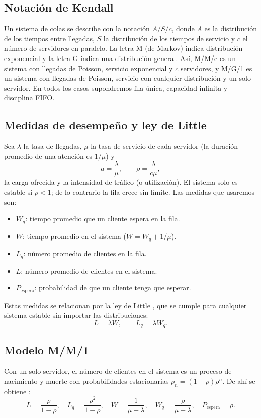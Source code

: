 \documentclass[11pt,letterpaper]{article}
\begin{document}
\subsection{Notación de Kendall}
Un sistema de colas se describe con la notación $A/S/c$, donde $A$ es la distribución de
los tiempos entre llegadas, $S$ la distribución de los tiempos de servicio y $c$ el número
de servidores en paralelo. La letra M (de Markov) indica distribución exponencial y la letra
G indica una distribución general. Así, M/M/c es un sistema con llegadas de Poisson,
servicio exponencial y $c$ servidores, y M/G/1 es un sistema con llegadas de Poisson,
servicio con cualquier distribución y un solo servidor. En todos los casos supondremos
fila única, capacidad infinita y disciplina FIFO.

\subsection{Medidas de desempeño y ley de Little}
Sea $\lambda$ la tasa de llegadas, $\mu$ la tasa de servicio de cada servidor (la duración
promedio de una atención es $1/\mu$) y
\begin{equation}
  a = \frac{\lambda}{\mu}, \qquad \rho = \frac{\lambda}{c\mu},
\end{equation}
la carga ofrecida y la intensidad de tráfico (o utilización). El sistema solo es estable si
$\rho < 1$; de lo contrario la fila crece sin límite. Las medidas que usaremos son:
\begin{itemize}[noitemsep]
  \item $W_q$: tiempo promedio que un cliente espera en la fila.
  \item $W$: tiempo promedio en el sistema ($W = W_q + 1/\mu$).
  \item $L_q$: número promedio de clientes en la fila.
  \item $L$: número promedio de clientes en el sistema.
  \item $P_{\text{espera}}$: probabilidad de que un cliente tenga que esperar.
\end{itemize}
Estas medidas se relacionan por la ley de Little \cite{little}, que se cumple para
cualquier sistema estable sin importar las distribuciones:
\begin{equation}
  L = \lambda W, \qquad L_q = \lambda W_q.
\end{equation}

\subsection{Modelo M/M/1}
Con un solo servidor, el número de clientes en el sistema es un proceso de nacimiento y
muerte con probabilidades estacionarias $p_n = (1-\rho)\rho^n$. De ahí se obtiene
\cite{gross,taha}:
\begin{equation}
  L = \frac{\rho}{1-\rho}, \quad
  L_q = \frac{\rho^2}{1-\rho}, \quad
  W = \frac{1}{\mu - \lambda}, \quad
  W_q = \frac{\rho}{\mu - \lambda}, \quad
  P_{\text{espera}} = \rho.
  \label{eq:mm1}
\end{equation}
\end{document}

